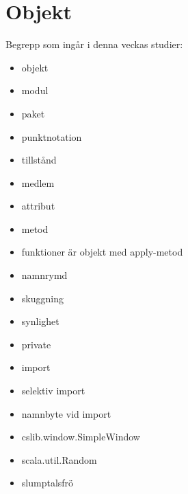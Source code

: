 \chapter{Objekt}\label{chapter:W04}
Begrepp som ingår i denna veckas studier:
\begin{itemize}[noitemsep,label={$\square$},leftmargin=*]
\item objekt
\item modul
\item paket
\item punktnotation
\item tillstånd
\item medlem
\item attribut
\item metod
\item funktioner är objekt med apply-metod
\item namnrymd
\item skuggning
\item synlighet
\item private
\item import
\item selektiv import
\item namnbyte vid import
\item cslib.window.SimpleWindow
\item scala.util.Random
\item slumptalsfrö\end{itemize}
